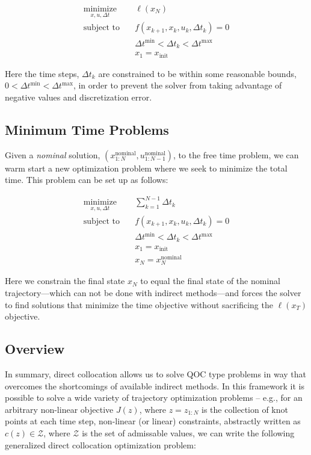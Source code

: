 \documentclass{article}
\newcommand{\minimize}[1]{\underset{#1}{\text{minimize}}}
\newcommand{\st}{\text{subject to}}
\begin{document}
\begin{align}
  \minimize{x, u, \Delta t} \quad & \ell(x_N) \\
  \st \quad & f(x_{k+1}, x_k, u_k, \Delta t_k) = 0 \\
            & \Delta t^{\min} < \Delta t_k < \Delta t^{\max} \\
            & x_1 = x_{\text{init}} 
\end{align}

Here the time steps, $\Delta t_k$ are constrained to be within some reasonable bounds, $0 < \Delta t^{\min} < \Delta t^{\max}$, in order to prevent the solver from taking advantage of negative values and discretization error.   

\subsection{Minimum Time Problems}

Given a \textit{nominal} solution, $(x_{1:N}^{\text{nominal}}, u_{1:N-1}^{\text{nominal}})$, to the free time problem, we can warm start a new optimization problem where we seek to minimize the total time.  This problem can be set up as follows:

\begin{align}
  \minimize{x, u, \Delta t} \quad & \sum_{k=1}^{N-1} \Delta t_k \\
  \st \quad & f(x_{k+1}, x_k, u_k, \Delta t_k) = 0 \\
            & \Delta t^{\min} < \Delta t_k < \Delta t^{\max} \\
            & x_1 = x_{\text{init}} \\
            & x_N = x_N^{\text{nominal}}
\end{align}

Here we constrain the final state $x_N$ to equal the final state of the nominal trajectory---which can not be done with indirect methods---and forces the solver to find solutions that minimize the time objective without sacrificing the $\ell(x_T)$ objective.

\subsection{Overview}
In summary, direct collocation allows us to solve QOC type problems in way that overcomes the shortcomings of available indirect methods.  In this framework it is possible to solve a wide variety of trajectory optimization problems -- e.g., for an arbitrary non-linear objective $J(z)$, where $z = z_{1:N}$ is the collection of knot points at each time step, non-linear (or linear) constraints, abstractly written as $c(z) \in \mathcal{Z}$, where $\mathcal{Z}$ is the set of admissable values, we can write the following generalized direct collocation optimization problem:
\end{document}
